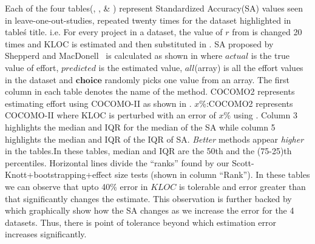 Each of the four tables(, ,  \& ) represent Standardized Accuracy(SA) values seen in leave-one-out-studies, repeated twenty times for the dataset highlighted in table\'s title. i.e. For every project in a dataset, the value of $r$ from  is changed 20 times and KLOC is estimated and then substituted in . SA proposed by Shepperd and MacDonell~\cite{shepperd12a} is calculated as shown in  where $actual$ is the true value of effort, $predicted$ is the estimated value, $all$(array) is all the effort values in the dataset and $\pmb{choice}$ randomly picks one value from an array.  The first column in each table denotes the name of the method. COCOMO2 represents estimating effort using COCOMO-II as shown in . $x$\%:COCOMO2 represents COCOMO-II where KLOC is perturbed with an error of $x$\% using . Column 3 highlights the median and IQR for the median of the SA while column 5 highlights the median and IQR of the IQR of SA.  {\em Better} methods appear {\em higher} in the tables.In these tables, median and IQR are the 50th and the  (75-25)th percentiles. Horizontal lines divide the ``ranks'' found by our Scott-Knott+bootstrapping+effect size tests (shown in column ``Rank''). In these tables we can observe that upto 40\% error in $KLOC$ is tolerable and error greater than that significantly changes the estimate. This observation is further backed by  which graphically show how the SA changes as we increase the error for the 4 datasets. Thus, there is point of tolerance beyond which estimation error increases significantly.